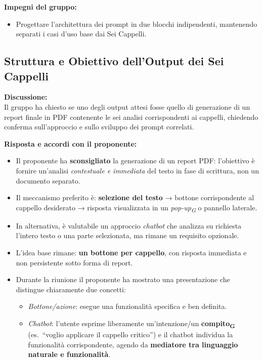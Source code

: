 \vspace{0.1cm}
\textbf{Impegni del gruppo:}
\begin{itemize}[leftmargin=1.5em, itemsep=3pt]
    \item Progettare l'architettura dei prompt in due blocchi indipendenti, mantenendo separati i casi d'uso base dai Sei Cappelli.
\end{itemize}

\vspace{0.4cm}

\subsection{Struttura e Obiettivo dell'Output dei Sei Cappelli}

\textbf{Discussione:}\\
Il gruppo ha chiesto se uno degli output attesi fosse quello di generazione di un report finale in PDF contenente le sei analisi corrispondenti ai cappelli, chiedendo conferma sull'approccio e sullo sviluppo dei prompt correlati.

\vspace{0.3cm}
\textbf{Risposta e accordi con il proponente:}
\begin{itemize}[leftmargin=1.5em, itemsep=3pt]
    \item Il proponente ha \textbf{sconsigliato} la generazione di un report PDF: l'obiettivo è fornire un'analisi \textit{contestuale e immediata} del testo in fase di scrittura, non un documento separato.
    \item Il meccanismo preferito è: \textbf{selezione del testo} → bottone corrispondente al cappello desiderato → risposta visualizzata in un \textit{pop-up\textsubscript{G}} o pannello laterale.
    \item In alternativa, è valutabile un approccio \textit{chatbot} che analizza su richiesta l'intero testo o una parte selezionata, ma rimane un requisito opzionale.
    \item L'idea base rimane: \textbf{un bottone per cappello}, con risposta immediata e non persistente sotto forma di report.
    \item Durante la riunione il proponente ha mostrato una presentazione che distingue chiaramente due concetti:
    \begin{itemize}[leftmargin=1.5em, itemsep=2pt]
        \item \textit{Bottone/azione}: esegue una funzionalità specifica e ben definita.
        \item \textit{Chatbot}: l'utente esprime liberamente un'intenzione/un \textbf{compito\textsubscript{G}}  (es.\ ``voglio applicare il cappello critico'') e il chatbot individua la funzionalità corrispondente, agendo da \textbf{mediatore tra linguaggio naturale e funzionalità}.
    \end{itemize}
\end{itemize}

